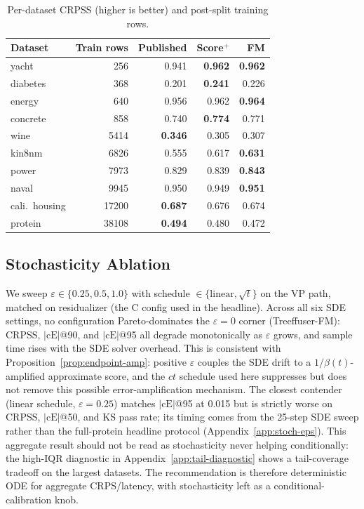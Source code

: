 \documentclass{uai2026}
\begin{document}
\begin{table}[!t]
  \centering
  \caption{Per-dataset CRPSS (higher is better) and post-split training rows.}\label{tab:per-dataset}
  \footnotesize
  \begin{tabular}{lrrrr}
    \toprule
    Dataset & Train rows & Published & Score$^+$ & FM \\
    \midrule
    yacht & 256 & 0.941 & \textbf{0.962} & \textbf{0.962} \\
    diabetes & 368 & 0.201 & \textbf{0.241} & 0.226 \\
    energy & 640 & 0.956 & 0.962 & \textbf{0.964} \\
    concrete & 858 & 0.740 & \textbf{0.774} & 0.771 \\
    wine & 5414 & \textbf{0.346} & 0.305 & 0.307 \\
    kin8nm & 6826 & 0.555 & 0.617 & \textbf{0.631} \\
    power & 7973 & 0.829 & 0.839 & \textbf{0.843} \\
    naval & 9945 & 0.950 & 0.949 & \textbf{0.951} \\
    cali.\ housing & 17200 & \textbf{0.687} & 0.676 & 0.674 \\
    protein & 38108 & \textbf{0.494} & 0.480 & 0.472 \\
    \bottomrule
  \end{tabular}
\end{table}

\subsection{Stochasticity Ablation}\label{sec:abl-sde}
We sweep $\varepsilon \in \{0.25, 0.5, 1.0\}$ with schedule $\in \{\text{linear},\sqrt{t}\}$ on the VP path, matched on residualizer (the C config used in the headline). Across all six SDE settings, no configuration Pareto-dominates the $\varepsilon = 0$ corner (Treeffuser-FM): CRPSS, $|\text{cE}|$@90, and $|\text{cE}|$@95 all degrade monotonically as $\varepsilon$ grows, and sample time rises with the SDE solver overhead. This is consistent with Proposition~\ref{prop:endpoint-amp}: positive $\varepsilon$ couples the SDE drift to a $1/\beta(t)$-amplified approximate score, and the $ct$ schedule used here suppresses but does not remove this possible error-amplification mechanism. The closest contender (linear schedule, $\varepsilon=0.25$) matches $|\text{cE}|$@95 at 0.015 but is strictly worse on CRPSS, $|\text{cE}|$@50, and KS pass rate; its timing comes from the 25-step SDE sweep rather than the full-protein headline protocol (Appendix~\ref{app:stoch-eps}). This aggregate result should not be read as stochasticity never helping conditionally: the high-IQR diagnostic in Appendix~\ref{app:tail-diagnostic} shows a tail-coverage tradeoff on the largest datasets. The recommendation is therefore deterministic ODE for aggregate CRPS/latency, with stochasticity left as a conditional-calibration knob.
\end{document}

